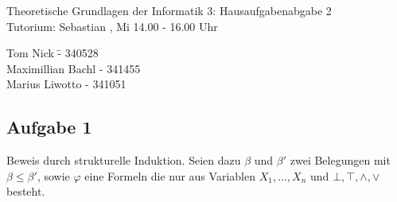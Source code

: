 \documentclass[a4paper,10pt]{article}
\begin{document}
\begin{center}
\Large{Theoretische Grundlagen der Informatik 3: Hausaufgabenabgabe 2} \\
\large{Tutorium: Sebastian , Mi 14.00 - 16.00 Uhr}
\end{center}
\begin{tabbing}
Tom Nick \hspace{2cm}\= - 340528\\
Maximillian Bachl \> - 341455 \\
Marius Liwotto\> -  341051
\end{tabbing}
\subsection*{Aufgabe 1}
Beweis durch strukturelle Induktion. Seien dazu $\beta$ und $\beta'$ zwei Belegungen mit $\beta \leq \beta'$, sowie $\varphi$ eine Formeln die nur aus Variablen $X_1,...,X_n$ und $\bot,\top,\land,\lor$ besteht.
\end{document}
